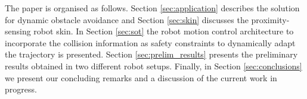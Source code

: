 The paper is organised as follows. Section \ref{sec:application} describes the solution for dynamic obstacle avoidance and Section \ref{sec:skin} discusses the proximity-sensing robot skin. In Section \ref{sec:sot} the robot motion control architecture to incorporate the collision information as safety
constraints to dynamically adapt the trajectory is presented. Section \ref{sec:prelim_results}
presents the preliminary results obtained in two different robot setups. Finally, in Section \ref{sec:conclusions} we present our concluding remarks and a discussion of the current work in progress.
